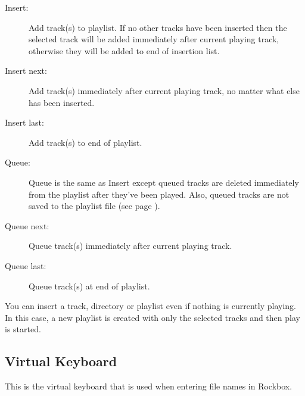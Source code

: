 \begin{description}
\item [Insert:]
  Add track(s) to playlist. If no other tracks have been inserted then the
  selected track will be added immediately after current playing track,
  otherwise they will be added to end of insertion list.
\item [Insert next:] 
  Add track(s) immediately after current playing track, no matter what else has
  been inserted.
\item [Insert last:]
  Add track(s) to end of playlist.
\item [Queue:]
  Queue is the same as Insert except queued tracks are deleted immediately from
  the playlist after they've been played. Also, queued tracks are not saved to
  the playlist file (see page \pageref{ref:playlistoptions}).
\item [Queue next:]
  Queue track(s) immediately after current playing track.
\item [Queue last:]
  Queue track(s) at end of playlist.
\end{description}

You can insert a track, directory or playlist even if nothing is currently
playing. In this case, a new playlist is created with only the selected tracks
and then play is started.\\

\subsection{Virtual Keyboard}
This is the virtual keyboard that is used when entering file names in Rockbox.

